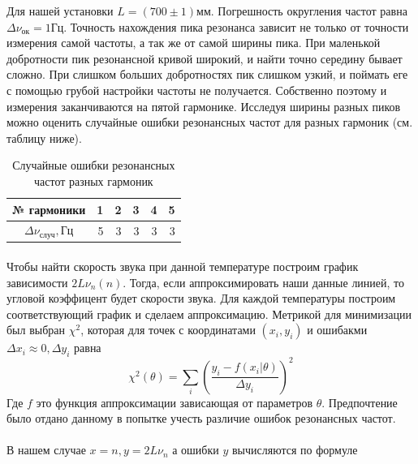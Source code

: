 \documentclass[a4paper, 12pt]{article}
\begin{document}
    Для нашей установки $L = (700 \pm 1)мм$. Погрешность округления частот равна $\Delta\nu_{ок}=1Гц$. Точность нахождения пика резонанса зависит не только от точности измерения самой частоты, а так же от самой ширины пика. При маленькой добротности пик резонансной кривой широкий, и найти точно середину бывает сложно. При слишком больших добротностях пик слишком узкий, и поймать еге с помощью грубой настройки частоты не получается. Собственно поэтому и измерения заканчиваются на пятой гармонике. Исследуя ширины разных пиков можно оценить случайные ошибки резонансных частот для разных гармоник (см. таблицу ниже).

    \begin{table}[h]
        \begin{center}
            \begin{tabular}{|c|r|r|r|r|r|}
                \hline
                {№ гармоники} &            1 &  2 &  3 &  4 & 5 \\
                \hline
                $\Delta\nu_{случ}, Гц$ &   5 &  3 &  3 &  3 & 3 \\\hline
            \end{tabular}
        \end{center}
        \caption{Случайные ошибки резонансных частот разных гармоник}
    \end{table}

    \paragraph{}
    Чтобы найти скорость звука при данной температуре построим график зависимости $2L\nu_n(n)$. Тогда, если аппроксимировать наши данные линией, то угловой коэффицент будет скорости звука. Для каждой температуры построим соответствующий график и сделаем аппроксимацию. Метрикой для минимизации был выбран $\chi^2$, которая для точек с координатами $(x_i, y_i)$ и ошибакми $\Delta x_i\approx 0, \Delta y_i$ равна
    \begin{equation}
        \chi^2(\theta) = \sum_{i}^{} \left(\frac{y_i-f(x_i| \theta)}{\Delta y_i}\right)^2
    \end{equation}
    Где $f$ это функция аппроксимации зависающая от параметров $\theta$. Предпочтение было отдано данному в попытке учесть различие ошибок резонансных частот.

    \paragraph{}
    В нашем случае $x=n, y=2L\nu_n$ а ошибки $y$ вычисляются по формуле
\end{document}

